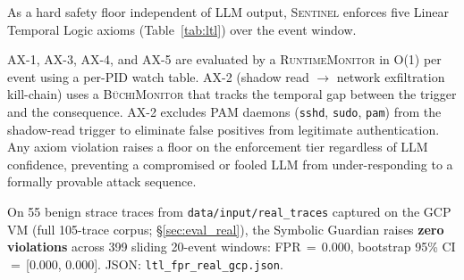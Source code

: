 \documentclass[journal]{IEEEtran}
\newcommand{\sentinel}{\textsc{Sentinel}}
\begin{document}
As a hard safety floor independent of LLM output, \sentinel{} enforces five
Linear Temporal Logic axioms (Table~\ref{tab:ltl}) over the event window.

\begin{table}[!h]
\caption{LTL safety axioms enforced by \sentinel{}'s Symbolic Guardian.
Tier-1 (RuntimeMonitor) is O(1) per event; Tier-2 (B\"{u}chiMonitor) tracks
temporal kill-chain sequences.}
\label{tab:ltl}
\centering
\footnotesize
\renewcommand{\arraystretch}{1.1}
\end{table}

AX-1, AX-3, AX-4, and AX-5 are evaluated by a \textsc{RuntimeMonitor} in O(1)
per event using a per-PID watch table.  AX-2 (shadow read $\to$ network
exfiltration kill-chain) uses a \textsc{B\"{u}chiMonitor} that tracks the
temporal gap between the trigger and the consequence.  AX-2 excludes PAM
daemons (\texttt{sshd}, \texttt{sudo}, \texttt{pam}) from the shadow-read
trigger to eliminate false positives from legitimate authentication.
Any axiom violation raises a floor on the enforcement tier regardless of LLM
confidence, preventing a compromised or fooled LLM from under-responding to
a formally provable attack sequence.

On 55 benign strace traces from \texttt{data/input/real\_traces} captured on
the GCP VM (full 105-trace corpus; \S\ref{sec:eval_real}), the Symbolic
Guardian raises \textbf{zero violations} across 399 sliding 20-event windows:
FPR\,$=$\,0.000, bootstrap 95\% CI\,$=$\,[0.000, 0.000]. JSON:
\texttt{ltl\_fpr\_real\_gcp.json}.
\end{document}

